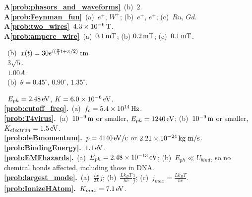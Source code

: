 {\bf A\ref{prob:phasors_and_waveforms}}~(b)~$2$.\\
{\bf A\ref{prob:Feynman_fun}}~(a)~$e^+$, $W^+$; (b)~$e^+$, $e^+$; (c)~$Ru$, $Gd$.\\
{\bf A\ref{prob:two_wires}}~$4.3\times 10^{-6}\,\mbox{T}$.\\
{\bf A\ref{prob:ampere_wire}}~(a)~$0.1\,\mbox{mT}$; (b) $0.2\,\mbox{mT}$; (c)~$0.1\,\mbox{mT}$. 


\medskip


~(b)~$x(t) = 30 e^{i(\frac{\pi}{3}t + \pi/2)}\,\mbox{cm}$.\\
~$3\sqrt{5}$.\\
~$1.00 A$.\\
~(b)~$\theta = 0.45^\circ$, $0.90^\circ$, $1.35^\circ$.

\medskip


~$E_{ph} = 2.48\,\mbox{eV}$, $K = 6.0 \times 10^{-6}\,\mbox{eV}$.\\
{\bf \ref{prob:cutoff_freq}.}~(a)~$f_c = 5.4 \times 10^{14}\,\mbox{Hz}$.\\
{\bf \ref{prob:T4virus}.}~(a)~$10^{-9} \,\mbox{m}$ or smaller, $E_{ph} = 1240 \,\mbox{eV}$; (b)~$10^{-9}\,\mbox{m}$ or smaller,
$K_{electron} = 1.5\,\mbox{eV}$.\\
{\bf \ref{prob:deBmomentum}.}~$p = 4140\,\mbox{eV/c}$ or $2.21 \times 10^{-24}\,\mbox{kg m/s}$.\\
{\bf \ref{prob:BindingEnergy}.}~$1.1\,\mbox{eV}$.\\
{\bf \ref{prob:EMFhazards}.}~(a)~$E_{ph} = 2.48 \times 10^{-13}\,\mbox{eV}$; (b)~$E_{ph} \ll U_{bind}$, so no chemical
bonds affected, including those in DNA.\\
{\bf \ref{prob:largest_mode}.}~(a)~$\frac{hc}{2L}j$; (b)~$\frac{Lk_BT}{hc}\frac{1}{j}$; (c)~$j_{max}=\frac{Lk_BT}{hc}$.\\
{\bf \ref{prob:IonizeHAtom}.}~$K_{max} = 7.1\,\mbox{eV}$.

